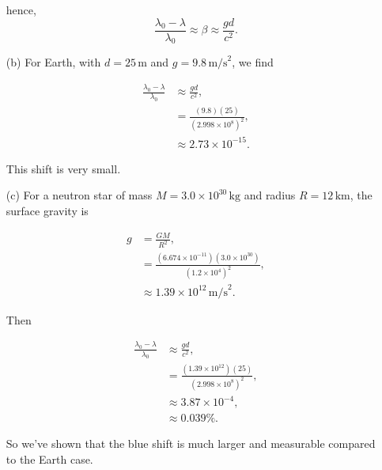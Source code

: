 \documentclass[12pt]{article}
\begin{document}
\begin{enumerate}
  hence,
  \[
  \frac{\lambda_0 - \lambda}{\lambda_0} \approx \beta \approx \frac{g d}{c^2}.
  \]

  \item[(b)]
  For Earth, with $d = 25\,\text{m}$ and $g = 9.8\,\text{m/s}^2$, we find

  \[
  \begin{aligned}
  \frac{\lambda_0 - \lambda}{\lambda_0} 
  &\approx \frac{g d}{c^2},\\
  &= \frac{(9.8)(25)}{(2.998\times 10^8)^2},\\
  &\approx 2.73\times 10^{-15}.
  \end{aligned}
  \]

  This shift is very small.

  \item[(c)]
  For a neutron star of mass $M = 3.0\times 10^{30}\,\text{kg}$ and radius $R = 12\,\text{km}$, the surface gravity is

\[
\begin{aligned}
g &= \frac{GM}{R^2},\\
&= \frac{(6.674\times 10^{-11})(3.0\times 10^{30})}{(1.2\times 10^{4})^2},\\
&\approx 1.39\times 10^{12}\,\text{m/s}^2.
\end{aligned}
\]

Then

\[
\begin{aligned}
\frac{\lambda_0 - \lambda}{\lambda_0}
&\approx \frac{g d}{c^2},\\
&= \frac{(1.39\times 10^{12})(25)}{(2.998\times 10^8)^2},\\
&\approx 3.87\times 10^{-4},\\
&\approx 0.039\%.
\end{aligned}
\]

So we've shown that the blue shift is much larger and measurable compared to the Earth case.
\newpage





\end{enumerate}
\end{document}
